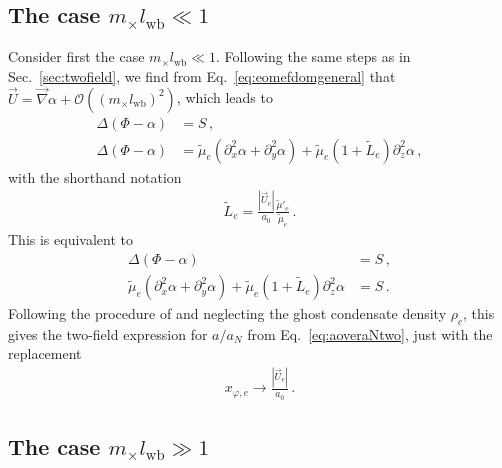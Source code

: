 \documentclass[reprint, amsmath,amssymb, nofootinbib, aps, prd]{revtex4-2}
\begin{document}
\subsection{The case $m_\times l_{\mathrm{wb}} \ll 1$}

Consider first the case $m_\times l_{\mathrm{wb}} \ll 1$.
Following the same steps as in Sec.~\ref{sec:twofield}, we find from Eq.~\eqref{eq:eomefdomgeneral} that $\vec{U} = \vec{\nabla} \alpha + \mathcal{O}((m_\times l_{\mathrm{wb}})^2)$, which leads to
\begin{subequations}
\begin{align}
\Delta (\Phi - \alpha) &= S \,, \\
\Delta (\Phi - \alpha) &= \tilde{\mu}_e (\partial_x^2 \alpha + \partial_y^2 \alpha) +  \tilde{\mu}_e (1 + \tilde{L}_e ) \partial_z^2 \alpha \,,
\end{align}
\end{subequations}
with the shorthand notation
\begin{align}
 \tilde{L}_e = \frac{|\vec{U}_e|}{a_0} \frac{\tilde{\mu}'_e}{\tilde{\mu}_e} \,.
\end{align}
This is equivalent to
\begin{subequations}
\begin{align}
\Delta (\Phi - \alpha) &= S \,, \\
\tilde{\mu}_e (\partial_x^2 \alpha + \partial_y^2 \alpha) +  \tilde{\mu}_e (1 + \tilde{L}_e ) \partial_z^2 \alpha &= S \,.
\end{align}
\end{subequations}
Following the procedure of \cite{Banik2015} and neglecting the ghost condensate density $\rho_c$, this gives the two-field expression for $a/a_N$ from Eq.~\eqref{eq:aoveraNtwo}, just with the replacement
\begin{align}
 x_{\varphi,e} \to \frac{|\vec{U}_e|}{a_0} \,.
\end{align}

\subsection{The case $m_\times l_{\mathrm{wb}} \gg 1$}
\end{document}
